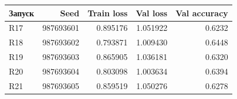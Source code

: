 \begin{tabular}{lrrrr}
\toprule
Запуск & Seed & Train loss & Val loss & Val accuracy \\
\midrule
R17 & 987693601 & 0.895176 & 1.051922 & 0.6232 \\
R18 & 987693602 & 0.793871 & 1.009430 & 0.6448 \\
R19 & 987693603 & 0.865905 & 1.036181 & 0.6320 \\
R20 & 987693604 & 0.803098 & 1.003634 & 0.6394 \\
R21 & 987693605 & 0.859519 & 1.050276 & 0.6278 \\
\bottomrule
\end{tabular}
